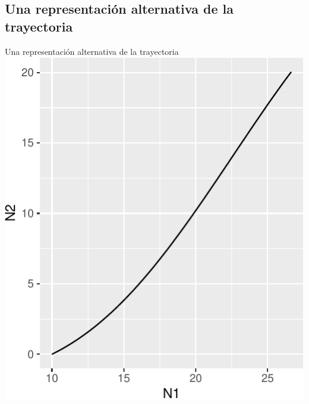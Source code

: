 \documentclass[
  11pt,
  ignorenonframetext,
]{beamer}
\begin{document}
\hypertarget{una-representaciuxf3n-alternativa-de-la-trayectoria}{%
\subsection{Una representación alternativa de la
trayectoria}\label{una-representaciuxf3n-alternativa-de-la-trayectoria}}

\begin{frame}{Una representación alternativa de la trayectoria}
\includegraphics{deSolve_files/figure-beamer/unnamed-chunk-27-1.pdf}
\end{frame}
\end{document}
